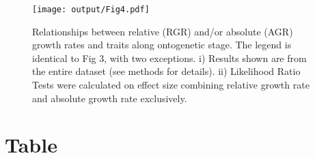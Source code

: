 \documentclass[a4paper,11pt]{article}
\begin{document}
\begin{figure}[h!]
\centering
\texttt{[image: output/Fig4.pdf]}
\caption{Relationships between relative (RGR) and/or absolute (AGR) growth rates and traits along ontogenetic stage. The legend is identical to Fig 3, with two exceptions. i) Results shown are from the entire dataset (see methods for details). ii) Likelihood Ratio Tests were calculated on effect size combining relative growth rate and absolute growth rate exclusively.}
\label{fig:fig4}
\end{figure}

\clearpage
\section*{Table}
\setcounter{table}{0}

\newcommand{\sepp}{{\color{grey}/}}
\end{document}
